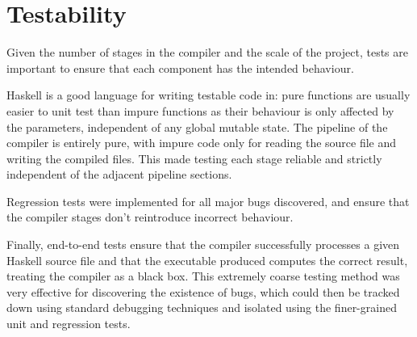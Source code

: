 \documentclass[dissertation.tex]{subfiles}
\begin{document}
\section{Testability}
{
    Given the number of stages in the compiler and the scale of the project, tests are important to ensure that each component has the intended behaviour.
    
    Haskell is a good language for writing testable code in: pure functions are usually easier to unit test than impure functions as their behaviour is only affected by the parameters, independent of any global mutable state. The pipeline of the compiler is entirely pure, with impure code only for reading the source file and writing the compiled files. This made testing each stage reliable and strictly independent of the adjacent pipeline sections.

    Regression tests were implemented for all major bugs discovered, and ensure that the compiler stages don't reintroduce incorrect behaviour. 

    Finally, end-to-end tests ensure that the compiler successfully processes a given Haskell source file and that the executable produced computes the correct result, treating the compiler as a black box. This extremely coarse testing method was very effective for discovering the existence of bugs, which could then be tracked down using standard debugging techniques and isolated using the finer-grained unit and regression tests. 

}
\end{document}
